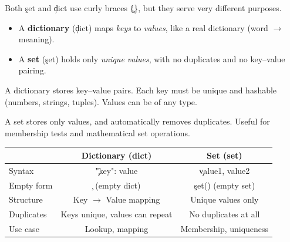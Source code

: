 
\begin{NoteBox}
Both \c{set} and \c{dict} use curly braces \c{\{\}}, but they serve very different purposes.  
\begin{itemize}
    \item A \textbf{dictionary} (\c{dict}) maps \emph{keys} to \emph{values}, like a real dictionary (word $\to$ meaning).
    \item A \textbf{set} (\c{set}) holds only \emph{unique values}, with no duplicates and no key--value pairing.
\end{itemize}
\end{NoteBox}

A dictionary stores key--value pairs. Each key must be unique and hashable (numbers, strings, tuples). Values can be of any type.



A set stores only values, and automatically removes duplicates. Useful for membership tests and mathematical set operations.




\begin{center}
\begin{tabular}{|l|c|c|}
\hline
 & \textbf{Dictionary ({dict})} & \textbf{Set ({set})} \\
\hline
Syntax & \c{{"key": value}} & \c{{value1, value2}} \\
Empty form & \c{{}} (empty dict) & \c{set()} (empty set) \\
Structure & Key $\to$ Value mapping & Unique values only \\
Duplicates & Keys unique, values can repeat & No duplicates at all \\
Use case & Lookup, mapping & Membership, uniqueness \\
\hline
\end{tabular}
\end{center}

